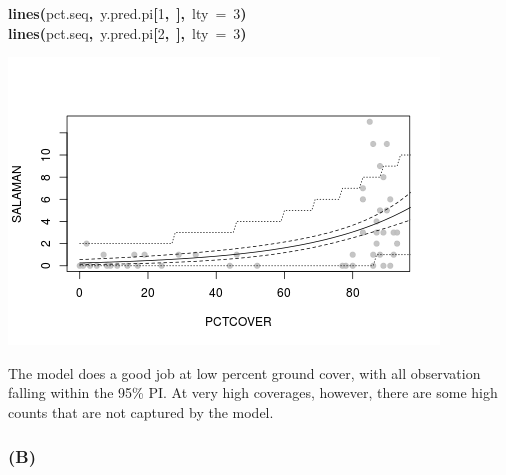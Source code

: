 \documentclass{article}
\makeatletter
\newcommand{\hlnumber}[1]{\textcolor[rgb]{0,0,0}{#1}}%
\newcommand{\hlfunctioncall}[1]{\textcolor[rgb]{.5,0,.33}{\textbf{#1}}}%
\newcommand{\hlkeyword}[1]{\textbf{#1}}%
\newcommand{\hlargument}[1]{\textcolor[rgb]{.69,.25,.02}{#1}}%
\newcommand{\hlsymbol}[1]{#1}%
\newcommand{\hlstd}[1]{\textcolor[rgb]{0,0,0}{#1}}%
\newenvironment{kframe}{%
 \def\FrameCommand##1{\hskip\@totalleftmargin \hskip-\fboxsep
 \colorbox{shadecolor}{##1}\hskip-\fboxsep
     \hskip-\linewidth \hskip-\@totalleftmargin \hskip\columnwidth}%
 \MakeFramed {\advance\hsize-\width
   \@totalleftmargin\z@ \linewidth\hsize
   \@setminipage}}%
 {\par\unskip\endMakeFramed}
\newenvironment{knitrout}{}{} %
\makeatother
\begin{document}
\begin{knitrout}
{\begin{kframe}
\begin{flushleft}
\hlstd{}\hlfunctioncall{lines}\hlkeyword{(}\hlsymbol{pct.seq}\hlkeyword{,}{\ }\hlsymbol{y.pred.pi}\hlkeyword{[}\hlnumber{1}\hlkeyword{,}{\ }\hlkeyword{]}\hlkeyword{,}{\ }\hlargument{lty}{\ }\hlargument{=}{\ }\hlnumber{3}\hlkeyword{)}\hspace*{\fill}\\
\hlstd{}\hlfunctioncall{lines}\hlkeyword{(}\hlsymbol{pct.seq}\hlkeyword{,}{\ }\hlsymbol{y.pred.pi}\hlkeyword{[}\hlnumber{2}\hlkeyword{,}{\ }\hlkeyword{]}\hlkeyword{,}{\ }\hlargument{lty}{\ }\hlargument{=}{\ }\hlnumber{3}\hlkeyword{)}\mbox{}
\normalfont
\end{flushleft}


\centering{}\includegraphics{sal-fig} 

\end{kframe}}
\end{knitrout}


The model does a good job at low percent ground cover, with all observation falling within the 95\% PI. 
At very high coverages, however, there are some high counts that are not captured by the model.


\subsubsection*{(B)}
\end{document}
